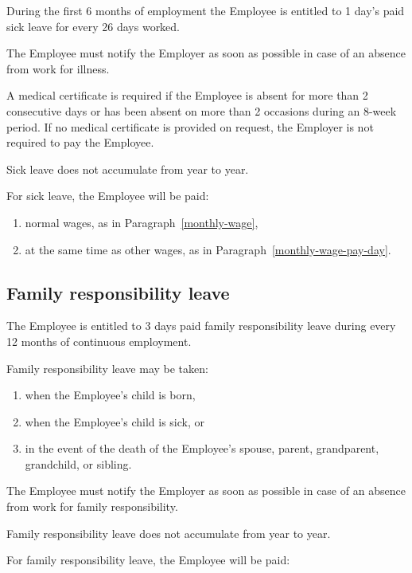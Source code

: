 \documentclass[a4paper,11pt]{article}
\begin{document}
\para\label{sick-leave-first-six-months} During the first 6 months of
employment the Employee is entitled to 1 day's paid sick leave for every 26
days worked.

\para The Employee must notify the Employer as soon as possible in case of an
absence from work for illness.

\para A medical certificate is required if the Employee is absent for more than
2 consecutive days or has been absent on more than 2 occasions during an 8-week
period. If no medical certificate is provided on request, the Employer is not
required to pay the Employee.

\para Sick leave does not accumulate from year to year.

\para For sick leave, the Employee will be paid:

\begin{enumerate}
  \item normal wages, as in Paragraph~\ref{monthly-wage},
  \item at the same time as other wages, as in
    Paragraph~\ref{monthly-wage-pay-day}.
\end{enumerate}

\subsection{Family responsibility leave}
\label{family-responsibility-leave}

\para The Employee is entitled to 3 days paid family responsibility leave
during every 12 months of continuous employment.

\para Family responsibility leave may be taken:

\begin{enumerate}
  \item when the Employee's child is born,
  \item when the Employee's child is sick, or
  \item in the event of the death of the Employee's spouse, parent,
    grandparent, grandchild, or sibling.
\end{enumerate}

\para The Employee must notify the Employer as soon as possible in case of an
absence from work for family responsibility.

\para Family responsibility leave does not accumulate from year to year.

\para For family responsibility leave, the Employee will be paid:
\end{document}
